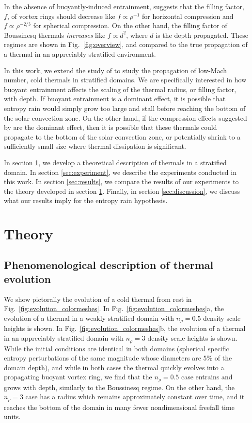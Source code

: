 \documentclass[twocolumn, amsmath, amsfonts, amssymb, trackchanges]{aastex62}
\begin{document}
In the absence of buoyantly-induced entrainment, \citet{brandenburg2016}
suggests that the filling factor, $f$, of vortex rings should decrease like
$f \propto \rho^{-1}$ for horizontal compression and $f \propto \rho^{-2/3}$ for 
spherical compression. On the other hand, the filling factor of Boussinesq
thermals \emph{increases} like $f \propto d^2$, where $d$ is the depth propagated.
These regimes are shown in Fig.~\ref{fig:overview}, and compared to the true
propagation of a thermal in an appreciably stratified environment.

In this work, we extend the study of \citet{lecoanet&jeevanjee2018} to study
the propagation of low-Mach number, cold thermals in stratified domains. We are
specifically interested in how
buoyant entrainment affects the scaling of the thermal radius, or filling factor, with depth. If
buoyant entrainment is a dominant effect, it is possible that entropy rain
would simply grow too large and stall before reaching the bottom of the solar convection zone.
On the other hand, if the compression effects suggested by \citet{brandenburg2016} are the
dominant effect, then it is possible that these thermals could propagate to the bottom of the solar
convection zone, or potentially shrink to a sufficiently small size where thermal dissipation is
significant.

In section \ref{sec:theory}, we develop a theoretical description
of thermals in a stratified domain. In section \ref{sec:experiment}, we describe 
the experiments conducted in this work. In section \ref{sec:results}, we compare the results
of our experiments to the theory developed in section \ref{sec:theory}. Finally, in section
\ref{sec:discussion}, we discuss what our results imply for the entropy rain hypothesis.

\section{Theory}
\label{sec:theory}

\subsection{Phenomenological description of thermal evolution}
We show pictorally the evolution of a cold thermal from rest in 
Fig.~\ref{fig:evolution_colormeshes}. In Fig.~\ref{fig:evolution_colormeshes}a,
the evolution of a thermal in a weakly stratified domain with
$n_\rho = 0.5$ density scale heights is shown. In Fig.~\ref{fig:evolution_colormeshes}b,
the evolution of a thermal in an appreciably stratified domain with
$n_\rho = 3$ density scale heights is shown. While the initial conditions are
identical in both domains (spherical specific entropy perturbations of the
same magnitude whose diameters are 5\% of the domain depth), and while in both cases
the thermal quickly evolves into a propagating buoyant vortex ring, we find that the
$n_\rho = 0.5$ case entrains and grows with depth, similarly to the Boussinesq regime.
On the other hand, the $n_\rho = 3$ case has a radius which remains approximately constant
over time, and it reaches the bottom of the domain in many fewer nondimensional freefall
time units.
\end{document}
